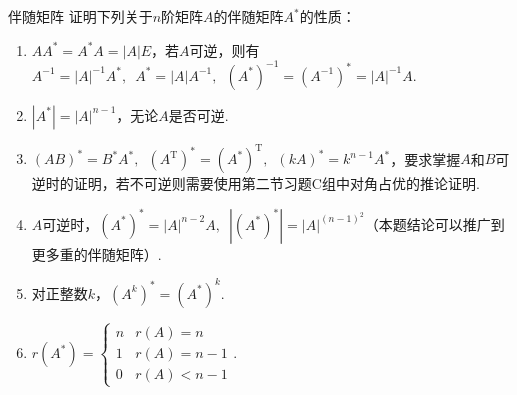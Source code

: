 \begin{example}{}{伴随矩阵}
    证明下列关于$n$阶矩阵$A$的伴随矩阵$A^*$的性质：
    \begin{enumerate}
        \item \label{item:13:伴随矩阵:1}
              $AA^*=A^*A=|A|E$，若$A$可逆，则有$A^{-1}=|A|^{-1}A^*,\enspace A^*=|A|A^{-1},\enspace (A^*)^{-1}=(A^{-1})^*=|A|^{-1}A$.

        \item $|A^*|=|A|^{n-1}$，无论$A$是否可逆.

        \item \label{item:13:伴随矩阵:3}
              $(AB)^*=B^*A^*,\enspace (A^\mathrm{T})^*=(A^*)^\mathrm{T},\enspace (kA)^*=k^{n-1}A^*$，要求掌握$A$和$B$可逆时的证明，若不可逆则需要使用第二节习题C组中对角占优的推论证明.

        \item $A$可逆时，$(A^*)^*=|A|^{n-2}A,\enspace |(A^*)^*|=|A|^{(n-1)^2}$（本题结论可以推广到更多重的伴随矩阵）.

        \item 对正整数$k$，$(A^k)^*=(A^*)^k$.

        \item $r(A^*)=\begin{cases}
                      n & r(A)=n     \\
                      1 & r(A)=n-1   \\
                      0 & r(A) < n-1
                  \end{cases}$.
    \end{enumerate}
\end{example}


